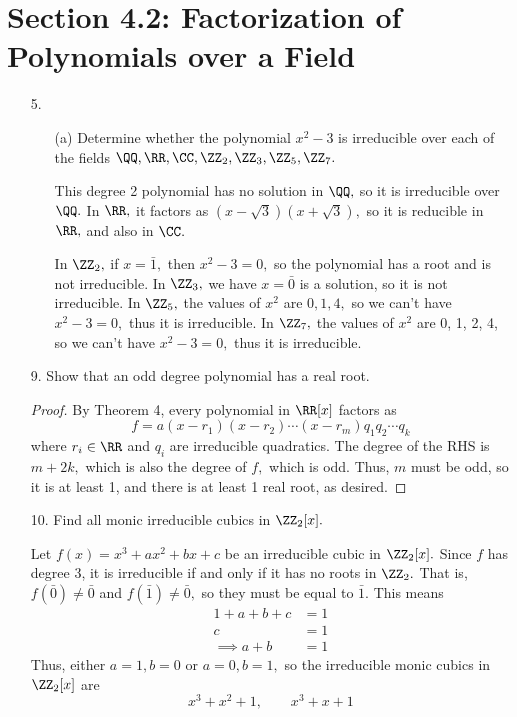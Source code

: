 \documentclass{article}
\begin{document}
\section*{Section 4.2: Factorization of Polynomials over a Field}

\begin{itemize}
	\item[5.] 
		\begin{itemize}
			\item[(a)] Determine whether the polynomial $x^2-3$ is irreducible over each of the fields $\QQ, \RR, \CC, \ZZ_2, \ZZ_3, \ZZ_5, \ZZ_7.$
				\begin{soln}
					This degree 2 polynomial has no solution in $\QQ,$ so it is irreducible over $\QQ.$ In $\RR,$ it factors as $(x-\sqrt{3})(x+\sqrt{3}),$ so it is reducible in $\RR,$ and also in $\CC.$

					In $\ZZ_2,$ if $x=\bar{1},$ then $x^2-3=0,$ so the polynomial has a root and is not irreducible. In $\ZZ_3,$ we have $x=\bar{0}$ is a solution, so it is not irreducible. In $\ZZ_5,$ the values of $x^2$ are $0, 1, 4,$ so we can't have $x^2-3=0,$ thus it is irreducible. In $\ZZ_7,$ the values of $x^2$ are 0, 1, 2, 4, so we can't have $x^2-3=0,$ thus it is irreducible.
				\end{soln}

		\end{itemize}

	\item[9.] Show that an odd degree polynomial has a real root.
		\begin{proof}
			By Theorem 4, every polynomial in $\RR[x]$ factors as \[f = a(x-r_1)(x-r_2)\cdots(x-r_m)q_1q_2\cdots q_k\] where $r_i\in \RR$ and $q_i$ are irreducible quadratics. The degree of the RHS is $m+2k,$ which is also the degree of $f,$ which is odd. Thus, $m$ must be odd, so it is at least 1, and there is at least 1 real root, as desired.
		\end{proof}

	\item[10.] Find all monic irreducible cubics in $\ZZ_2[x].$
		\begin{soln}
			Let $f(x)=x^3+ax^2+bx+c$ be an irreducible cubic in $\ZZ_2[x].$ Since $f$ has degree 3, it is irreducible if and only if it has no roots in $\ZZ_2.$ That is, $f(\bar{0})\neq\bar0$ and $f(\bar1)\neq\bar0,$ so they must be equal to $\bar1.$ This means
			\begin{align*}
				1+a+b+c&= 1 \\
				c &= 1 \\
				\implies a+b &= 1
			\end{align*}
			Thus, either $a=1, b=0$ or $a=0, b=1,$ so the irreducible monic cubics in $\ZZ_2[x]$ are \[x^3+x^2+1, \quad\quad x^3+x+1\]
		\end{soln}
		
\end{itemize}
\end{document}
